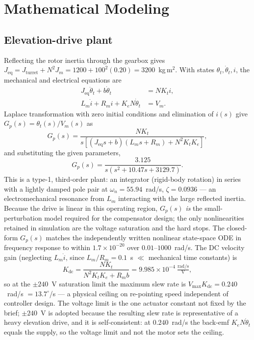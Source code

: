 \documentclass[conference]{IEEEtran}
\begin{document}
\section{Mathematical Modeling}

\subsection{Elevation-drive plant}\label{sec:plant}
Reflecting the rotor inertia through the gearbox gives $J_{\mathrm{eq}}=J_{\mathrm{turret}}+N^2J_m=1200+100^2(0.20)=3200$~kg\,m$^2$. With states $\theta_t,\dot\theta_t,i$, the mechanical and electrical equations are
\begin{align}
J_{\mathrm{eq}}\ddot\theta_t + b\dot\theta_t &= NK_t i,\\
L_m\dot i + R_m i + K_e N \dot\theta_t &= V_m .
\end{align}
Laplace transformation with zero initial conditions and elimination of $i(s)$ give $G_p(s)=\theta_t(s)/V_m(s)$ as
\begin{equation}
G_p(s)=\frac{NK_t}{s\left[(J_{\mathrm{eq}}s+b)(L_m s+R_m)+N^2K_tK_e\right]},
\end{equation}
and substituting the given parameters,
\begin{equation}
G_p(s)=\frac{3.125}{s\left(s^2+10.47s+3129.7\right)}.
\label{eq:gp}
\end{equation}
This is a type-1, third-order plant: an integrator (rigid-body rotation) in series with a lightly damped pole pair at $\omega_n=55.94$~rad/s, $\zeta=0.0936$ --- an electromechanical resonance from $L_m$ interacting with the large reflected inertia. Because the drive is linear in this operating region, $G_p(s)$ \emph{is} the small-perturbation model required for the compensator design; the only nonlinearities retained in simulation are the voltage saturation and the hard stops. The closed-form $G_p(s)$ matches the independently written nonlinear state-space ODE in frequency response to within $1.7\times10^{-20}$ over $0.01$--$1000$~rad/s. The DC velocity gain (neglecting $L_m\dot i$, since $L_m/R_m=0.1$~s $\ll$ mechanical time constants) is
\begin{equation}
K_{\mathrm{dc}}=\frac{NK_t}{N^2K_tK_e+R_mb}=9.985\times10^{-4}\ \tfrac{\mathrm{rad/s}}{\mathrm{V}},
\label{eq:kdc}
\end{equation}
so at the $\pm240$~V saturation limit the maximum slew rate is $V_{\max}K_{\mathrm{dc}}=0.240$~rad/s $=13.7^\circ$/s --- a physical ceiling on re-pointing speed independent of controller design. The voltage limit is the one actuator constant not fixed by the brief; $\pm240$~V is adopted because the resulting slew rate is representative of a heavy elevation drive, and it is self-consistent: at $0.240$~rad/s the back-emf $K_eN\dot\theta_t$ equals the supply, so the voltage limit and not the motor sets the ceiling.
\end{document}
